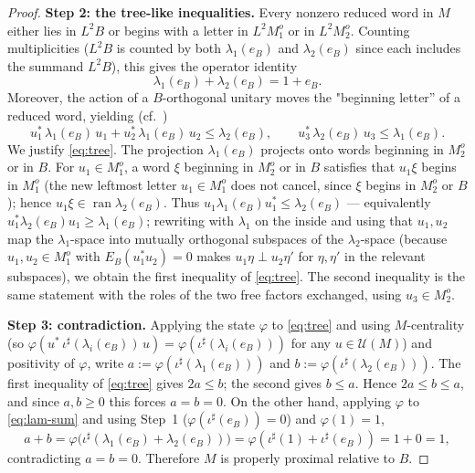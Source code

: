 \documentclass[a4paper, 11pt, reqno]{amsart}
\numberwithin{equation}{section}
\theoremstyle{plain}
\theoremstyle{remark}
\theoremstyle{definition}
\newcommand{\S}{\mathbb{S}}
\begin{document}
\begin{proof}
\medskip\noindent\textbf{Step 2: the tree-like inequalities.}
Every nonzero reduced word in $M$ either lies in $L^2B$ or begins with a letter in $L^2M_1^o$ or in $L^2M_2^o$. Counting multiplicities ($L^2B$ is counted by both $\lambda_1(e_B)$ and $\lambda_2(e_B)$ since each includes the summand $L^2B$), this gives the operator identity
\begin{equation}\label{eq:lam-sum}
\lambda_1(e_B)+\lambda_2(e_B)=1+e_B .
\end{equation}
Moreover, the action of a $B$-orthogonal unitary moves the "beginning letter'' of a reduced word, yielding (cf.\ \cite[\S4]{toyosawa2025relative})
\begin{equation}\label{eq:tree}
u_1^*\,\lambda_1(e_B)\,u_1+u_2^*\,\lambda_1(e_B)\,u_2\le\lambda_2(e_B),\qquad
u_3^*\,\lambda_2(e_B)\,u_3\le\lambda_1(e_B).
\end{equation}
We justify \eqref{eq:tree}. The projection $\lambda_1(e_B)$ projects onto words beginning in $M_2^o$ or in $B$. For $u_1\in M_1^o$, a word $\xi$ beginning in $M_2^o$ or in $B$ satisfies that $u_1\xi$ begins in $M_1^o$ (the new leftmost letter $u_1\in M_1^o$ does not cancel, since $\xi$ begins in $M_2^o$ or $B$); hence $u_1\xi\in\operatorname{ran}\lambda_2(e_B)$. Thus $u_1\lambda_1(e_B)u_1^*\le\lambda_2(e_B)$ — equivalently $u_1^*\lambda_2(e_B)u_1\ge\lambda_1(e_B)$; rewriting with $\lambda_1$ on the inside and using that $u_1,u_2$ map the $\lambda_1$-space into mutually orthogonal subspaces of the $\lambda_2$-space (because $u_1,u_2\in M_1^o$ with $E_B(u_1^*u_2)=0$ makes $u_1\eta\perp u_2\eta'$ for $\eta,\eta'$ in the relevant subspaces), we obtain the first inequality of \eqref{eq:tree}. The second inequality is the same statement with the roles of the two free factors exchanged, using $u_3\in M_2^o$.

\medskip\noindent\textbf{Step 3: contradiction.}
Applying the state $\varphi$ to \eqref{eq:tree} and using $M$-centrality (so $\varphi(u^*\,\iota^\sharp(\lambda_i(e_B))\,u)=\varphi(\iota^\sharp(\lambda_i(e_B)))$ for any $u\in\mathcal U(M)$) and positivity of $\varphi$, write $a:=\varphi(\iota^\sharp(\lambda_1(e_B)))$ and $b:=\varphi(\iota^\sharp(\lambda_2(e_B)))$. The first inequality of \eqref{eq:tree} gives $2a\le b$; the second gives $b\le a$. Hence $2a\le b\le a$, and since $a,b\ge0$ this forces $a=b=0$. On the other hand, applying $\varphi$ to \eqref{eq:lam-sum} and using Step~1 ($\varphi(\iota^\sharp(e_B))=0$) and $\varphi(1)=1$,
\[
a+b=\varphi\big(\iota^\sharp(\lambda_1(e_B)+\lambda_2(e_B))\big)=\varphi(\iota^\sharp(1)+\iota^\sharp(e_B))=1+0=1,
\]
contradicting $a=b=0$. Therefore $M$ is properly proximal relative to $B$.
\end{proof}
\end{document}
